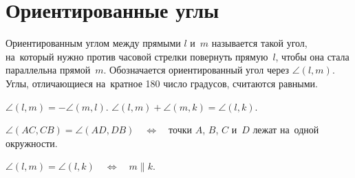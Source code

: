
\section*{Ориентированные углы}


Ориентированным углом между прямыми $l$ и~$m$ называется такой угол, на~который
нужно против часовой стрелки повернуть прямую~$l$, чтобы она стала параллельна
прямой~$m$.
Обозначается ориентированный угол через $\angle (l, m)$.
Углы, отличающиеся на~кратное 180 число градусов, считаются равными.

\setcounter{jeolmsubproblem}{0}
\par
\sp $\angle (l, m) = - \angle (m, l)$.
\qquad
\sp $\angle (l, m) + \angle (m, k) = \angle (l, k)$.
\par
\sp \(
    \angle (AC, CB) = \angle (AD, DB)
\quad\Leftrightarrow\quad
    \)точки $A$, $B$, $C$ и~$D$ лежат на~одной окружности.
\par
\sp \(
    \angle (l, m) = \angle (l, k)
\quad\Leftrightarrow\quad
    m \parallel k
\).

